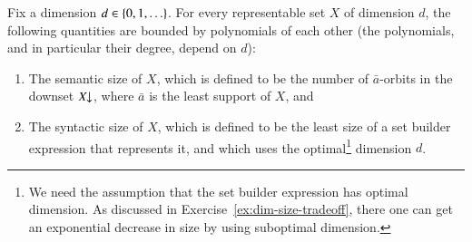 \begin{lemma}\label{lem:sizes-are-the-same}
  Fix a dimension $d \in \{0,1,\ldots\}$. For every representable set $X$ of dimension $d$, the  following quantities are bounded by polynomials of each other (the polynomials, and in particular their degree, depend on $d$): 
  \begin{enumerate}
    \item \label{it:sem-size} The semantic size of $X$, which is defined to be the number of $\bar a$-orbits in the downset $X\!\!\downarrow$, where $\bar a$ is the least support of $X$, and
    \item \label{it:synt-size} The syntactic size of $X$, which is defined to be the least size of a set builder expression that represents it, and which uses the optimal\footnote{We need the assumption that the set builder expression has optimal dimension. As discussed in Exercise~\ref{ex:dim-size-tradeoff}, there one can get an exponential decrease in size by using suboptimal dimension. } dimension $d$.  
  \end{enumerate}
\end{lemma}

